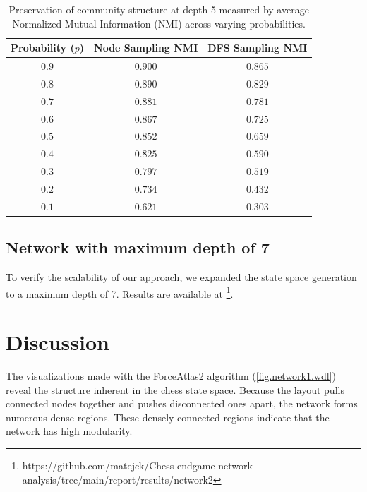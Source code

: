 \documentclass[9pt,twocolumn,twoside]{pnas-report}
\begin{document}
\begin{table}[ht]
\centering
\caption{Preservation of community structure at depth 5 measured by average Normalized Mutual Information (NMI) across varying probabilities.}
\begin{tabular}{c c c}
\hline
\textbf{Probability ($p$)} & \textbf{Node Sampling NMI} & \textbf{DFS Sampling NMI} \\
\hline
$0.9$ & $0.900$ \raisebox{0.1ex}{\scriptsize $\pm 0.023$} & $0.865$ \raisebox{0.1ex}{\scriptsize $\pm 0.021$} \\
$0.8$ & $0.890$ \raisebox{0.1ex}{\scriptsize $\pm 0.018$} & $0.829$ \raisebox{0.1ex}{\scriptsize $\pm 0.022$} \\
$0.7$ & $0.881$ \raisebox{0.1ex}{\scriptsize $\pm 0.027$} & $0.781$ \raisebox{0.1ex}{\scriptsize $\pm 0.019$} \\
$0.6$ & $0.867$ \raisebox{0.1ex}{\scriptsize $\pm 0.022$} & $0.725$ \raisebox{0.1ex}{\scriptsize $\pm 0.021$} \\
$0.5$ & $0.852$ \raisebox{0.1ex}{\scriptsize $\pm 0.015$} & $0.659$ \raisebox{0.1ex}{\scriptsize $\pm 0.019$} \\
$0.4$ & $0.825$ \raisebox{0.1ex}{\scriptsize $\pm 0.016$} & $0.590$ \raisebox{0.1ex}{\scriptsize $\pm 0.012$} \\
$0.3$ & $0.797$ \raisebox{0.1ex}{\scriptsize $\pm 0.014$} & $0.519$ \raisebox{0.1ex}{\scriptsize $\pm 0.006$} \\
$0.2$ & $0.734$ \raisebox{0.1ex}{\scriptsize $\pm 0.012$} & $0.432$ \raisebox{0.1ex}{\scriptsize $\pm 0.005$} \\
$0.1$ & $0.621$ \raisebox{0.1ex}{\scriptsize $\pm 0.009$} & $0.303$ \raisebox{0.1ex}{\scriptsize $\pm 0.164$} \\
\hline
\end{tabular}
\label{table.network1.NMI}
\end{table}

\subsection{Network with maximum depth of 7}
To verify the scalability of our approach, we expanded the state space generation to a maximum depth of 7. Results are available at \footnote{https://github.com/matejck/Chess-endgame-network-analysis/tree/main/report/results/network2}.

\section*{Discussion}
The visualizations made with the ForceAtlas2 algorithm (\ref{fig.network1.wdl}) reveal the structure inherent in the chess state space. Because the layout pulls connected nodes together and pushes disconnected ones apart, the network forms numerous dense regions. These densely connected regions indicate that the network has high modularity.
\end{document}
